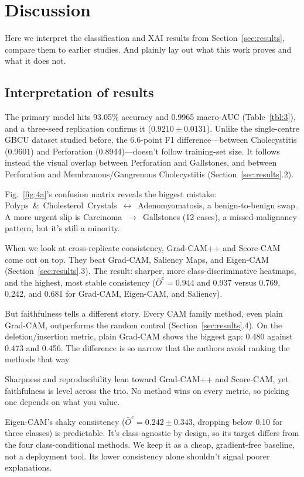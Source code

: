 \section{Discussion}
\label{sec:discussion}

Here we interpret the classification and XAI results from Section~\ref{sec:results}, compare them to earlier studies. And plainly lay out what this work proves and what it does not.

\subsection{Interpretation of results}

The primary model hits 93.05\% accuracy and 0.9965 macro-AUC (Table~\ref{tbl:3}), and a three-seed replication confirms it ($0.9210\pm0.0131$). Unlike the single-centre GBCU dataset studied before, the 6.6-point F1 difference---between Cholecystitis (0.9601) and Perforation (0.8944)---doesn't follow training-set size. It follows instead the visual overlap between Perforation and Gallstones, and between Perforation and Membranous/Gangrenous Cholecystitis (Section~\ref{sec:results}.2).

Fig.~\ref{fig:4a}'s confusion matrix reveals the biggest mistake: Polyps~\&~Cholesterol~Crystals~$\leftrightarrow$~Adenomyomatosis, a benign-to-benign swap. A more urgent slip is Carcinoma~$\rightarrow$~Gallstones (12 cases), a missed-malignancy pattern, but it's still a minority.

When we look at cross-replicate consistency, Grad-CAM++ and Score-CAM come out on top. They beat Grad-CAM, Saliency Maps, and Eigen-CAM (Section~\ref{sec:results}.3). The result: sharper, more class-discriminative heatmaps, and the highest, most stable consistency ($\bar{O}^c=0.944$ and $0.937$ versus 0.769, 0.242, and 0.681 for Grad-CAM, Eigen-CAM, and Saliency).

But faithfulness tells a different story. Every CAM family method, even plain Grad-CAM, outperforms the random control (Section~\ref{sec:results}.4). On the deletion/insertion metric, plain Grad-CAM shows the biggest gap: 0.480 against 0.473 and 0.456. The difference is so narrow that the authors avoid ranking the methods that way.

Sharpness and reproducibility lean toward Grad-CAM++ and Score-CAM, yet faithfulness is level across the trio. No method wins on every metric, so picking one depends on what you value.

Eigen-CAM's shaky consistency ($\bar{O}^c=0.242\pm0.343$, dropping below 0.10 for three classes) is predictable. It's class-agnostic by design, so its target differs from the four class-conditional methods. We keep it as a cheap, gradient-free baseline, not a deployment tool. Its lower consistency alone shouldn't signal poorer explanations.

